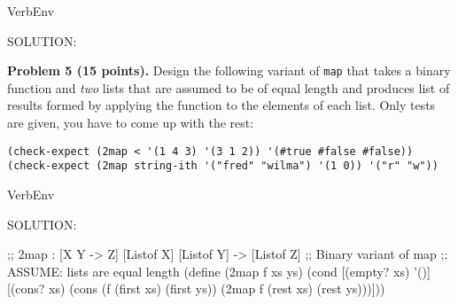 \documentclass[12pt]{article}
\begin{document}
\begin{SaveVerbatim}{VerbEnv}


SOLUTION:

\end{SaveVerbatim}












\newpage 
\noindent
{\bf Problem 5 (15 points).}
%
Design the following variant of {\tt map} that takes a binary function
and \emph{two} lists that are assumed to be of equal length and
produces list of results formed by applying the function to the
elements of each list.  Only tests are given, you have to come up with
the rest:
\begin{verbatim}
(check-expect (2map < '(1 4 3) '(3 1 2)) '(#true #false #false))
(check-expect (2map string-ith '("fred" "wilma") '(1 0)) '("r" "w"))
\end{verbatim}


\begin{SaveVerbatim}{VerbEnv}


SOLUTION:

;; 2map : [X Y -> Z] [Listof X] [Listof Y] -> [Listof Z]
;; Binary variant of map
;; ASSUME: lists are equal length
(define (2map f xs ys)
  (cond [(empty? xs) '()]
        [(cons? xs)
         (cons (f (first xs) (first ys))
               (2map f (rest xs) (rest ys)))]))
\end{SaveVerbatim}
\end{document}
